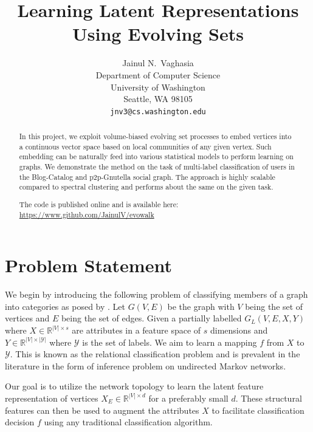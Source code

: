 \documentclass{article}
\title{Learning Latent Representations Using Evolving Sets}
\author{%
  Jainul N.~Vaghasia\\
  Department of Computer Science\\
  University of Washington\\
  Seattle, WA 98105 \\
  \texttt{jnv3@cs.washington.edu} \\
}
\begin{document}

\maketitle

\begin{abstract}
  In this project, we exploit volume-biased evolving set processes to embed vertices
  into a continuous vector space based on local communities of any given vertex.
  Such embedding can be naturally feed into various statistical models to perform learning on graphs.
  We demonstrate the method on the task of multi-label classification of users in the
  Blog-Catalog and p2p-Gnutella social graph. The approach is highly scalable compared to spectral clustering
  and performs about the same on the given task.

  The code is published online and is available here: \url{https://www.github.com/JainulV/evowalk}
\end{abstract}

\section{Problem Statement}
We begin by introducing the following problem of classifying members of a graph into categories as posed by \cite{Perozzi_2014}. Let \(G(V, E)\)
be the graph with \(V\) being the set of vertices and \(E\) being the set of edges. Given a partially labelled \(G_L(V, E, X, Y)\)
where \(X\in\mathbb{R}^{|V|\times s}\) are attributes in a feature space of \(s\) dimensions and \(Y\in\mathbb{R}^{|V|\times |\mathcal{Y}|}\)
where \(\mathcal{Y}\) is the set of labels. We aim to learn a mapping \(f\) from \(X\) to \(\mathcal{Y}\). This is known as the relational classification problem and is prevalent in the literature in the form of
inference problem on undirected Markov networks.

Our goal is to utilize the network topology to learn the latent feature representation of vertices \(X_E\in \mathbb{R}^{|V|\times d}\) for a preferably small \(d\). These structural
features can then be used to augment the attributes \(X\) to facilitate classification decision \(f\) using any traditional classification algorithm.
\end{document}
